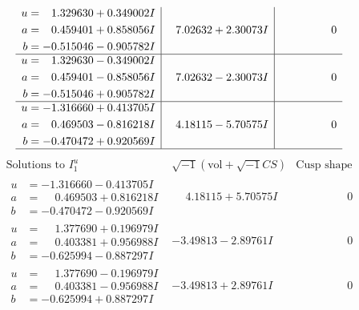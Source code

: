 \documentclass[1p]{elsarticle_modified}
\theoremstyle{definition}
\newcommand{\I}{\sqrt{-1}}
\begin{document}
$$\begin{array}{c|c|c}
\begin{aligned}
u &= \phantom{-}1.329630 + 0.349002 I \\
a &= \phantom{-}0.459401 + 0.858056 I \\
b &= -0.515046 - 0.905782 I\end{aligned}
 & \phantom{-}7.02632 + 2.30073 I & \phantom{-0.000000 } 0 \\ \hline\begin{aligned}
u &= \phantom{-}1.329630 - 0.349002 I \\
a &= \phantom{-}0.459401 - 0.858056 I \\
b &= -0.515046 + 0.905782 I\end{aligned}
 & \phantom{-}7.02632 - 2.30073 I & \phantom{-0.000000 } 0 \\ \hline\begin{aligned}
u &= -1.316660 + 0.413705 I \\
a &= \phantom{-}0.469503 - 0.816218 I \\
b &= -0.470472 + 0.920569 I\end{aligned}
 & \phantom{-}4.18115 - 5.70575 I & \phantom{-0.000000 } 0\\
 \hline 
 \end{array}$$\newpage$$\begin{array}{c|c|c}  
\text{Solutions to }I^u_{1}& \I (\text{vol} + \sqrt{-1}CS) & \text{Cusp shape}\\
 \hline 
\begin{aligned}
u &= -1.316660 - 0.413705 I \\
a &= \phantom{-}0.469503 + 0.816218 I \\
b &= -0.470472 - 0.920569 I\end{aligned}
 & \phantom{-}4.18115 + 5.70575 I & \phantom{-0.000000 } 0 \\ \hline\begin{aligned}
u &= \phantom{-}1.377690 + 0.196979 I \\
a &= \phantom{-}0.403381 + 0.956988 I \\
b &= -0.625994 - 0.887297 I\end{aligned}
 & -3.49813 - 2.89761 I & \phantom{-0.000000 } 0 \\ \hline\begin{aligned}
u &= \phantom{-}1.377690 - 0.196979 I \\
a &= \phantom{-}0.403381 - 0.956988 I \\
b &= -0.625994 + 0.887297 I\end{aligned}
 & -3.49813 + 2.89761 I & \phantom{-0.000000 } 0 \\ \hline\begin{aligned}

\end{aligned}
\end{array}$$
\end{document}
